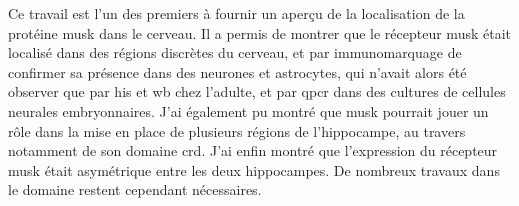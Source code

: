 Ce travail est l'un des premiers à fournir un aperçu de la localisation de la protéine \gls{musk} dans le cerveau. Il a permis de montrer que le récepteur \gls{musk} était localisé dans des régions discrètes du cerveau, et par immunomarquage de confirmer sa présence dans des neurones et astrocytes, qui n'avait alors été observer que par \gls{his} et \gls{wb} chez l'adulte, et par \gls{qpcr} dans des cultures de cellules neurales embryonnaires. J'ai également pu montré que \gls{musk} pourrait jouer un rôle dans la mise en place de  plusieurs régions de l'hippocampe, au travers notamment de son domaine \gls{crd}. J'ai enfin montré que l'expression du récepteur \gls{musk} était asymétrique entre les deux hippocampes. De nombreux travaux dans le domaine restent cependant nécessaires.